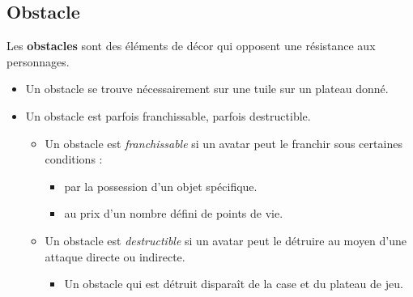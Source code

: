 \subsection{Obstacle}
Les \textbf{obstacles} sont des éléments de décor qui opposent une résistance aux personnages.
\begin{itemize}
    \item Un obstacle se trouve nécessairement sur une tuile sur un plateau donné.
    \item Un obstacle est parfois franchissable, parfois destructible.
        \begin{itemize}
            \item Un obstacle est \textit{franchissable} si un avatar peut le franchir sous certaines conditions :
                \begin{itemize}
                    \item par la possession d'un objet spécifique.
                    \item au prix d'un nombre défini de points de vie.
                \end{itemize}
            \item Un obstacle est \textit{destructible} si un avatar peut le détruire au moyen d'une attaque directe ou indirecte.
                \begin{itemize}
                    \item Un obstacle qui est détruit disparaît de la case et du plateau de jeu.
                \end{itemize}
        \end{itemize}
        

\end{itemize}
